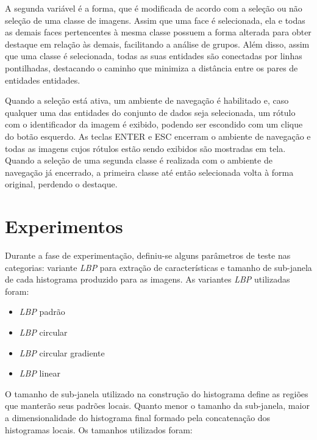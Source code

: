 \documentclass[conference]{IEEEtran}
\begin{document}
A segunda variável é a forma, que é modificada de acordo com a seleção ou não seleção de uma classe de imagens. Assim que uma face é selecionada, ela e todas as demais faces pertencentes à mesma classe possuem a forma alterada para obter destaque em relação às demais, facilitando a análise de grupos. Além disso, assim que uma classe é selecionada, todas as suas entidades são conectadas por linhas pontilhadas, destacando o caminho que minimiza a distância entre os pares de entidades entidades. 

Quando a seleção está ativa, um ambiente de navegação é habilitado e, caso qualquer uma das entidades do conjunto de dados seja selecionada, um rótulo com o identificador da imagem é exibido, podendo ser escondido com um clique do botão esquerdo. As teclas ENTER e ESC encerram o ambiente de navegação e todas as imagens cujos rótulos estão sendo exibidos são mostradas em tela. Quando a seleção de uma segunda classe é realizada com o ambiente de navegação já encerrado, a primeira classe até então selecionada volta à forma original, perdendo o destaque.

\section{Experimentos}
\label{sec_experimentos}

Durante a fase de experimentação, definiu-se alguns parâmetros de teste nas categorias: variante \textit{LBP} para extração de características e tamanho de sub-janela de cada histograma produzido para as imagens. As variantes \textit{LBP} utilizadas foram:

\begin{itemize}

\item \textit{LBP} padrão

\item \textit{LBP} circular

\item \textit{LBP} circular gradiente

\item \textit{LBP} linear

\end{itemize} 

O tamanho de sub-janela utilizado na construção do histograma define as regiões que manterão seus padrões locais. Quanto menor o tamanho da sub-janela, maior a dimensionalidade do histograma final formado pela concatenação dos histogramas locais. Os tamanhos utilizados foram:
\end{document}
